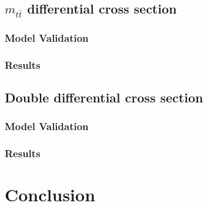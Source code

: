 \documentclass[a4paper]{article}
\begin{document}
\subsection{\texorpdfstring{$m_{t\bar{t}}$}{mttbar} differential cross section}
\subsubsection{Model Validation}
\subsubsection{Results}

\subsection{Double differential cross section}
\subsubsection{Model Validation}
\subsubsection{Results}

\section{Conclusion}

\newpage
\begingroup
\raggedright{}
\sloppy
\printbibliography{}
\endgroup
\end{document}
